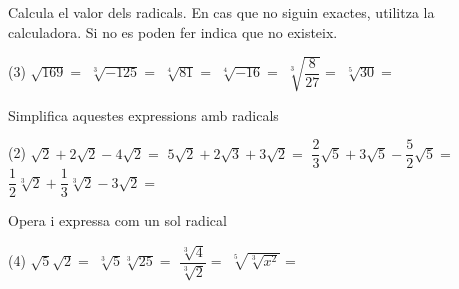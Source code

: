 \documentclass{article}
\let\frac\dfrac
\begin{document}
\begin{mylist}
  \vspace{2cm}
  \item Calcula el valor dels radicals. En cas que no siguin exactes, utilitza la calculadora. Si no es poden fer indica que no existeix.
  \begin{tasks}(3)
  	\task $\sqrt{169}=$
  	\task $\sqrt[3]{-125}=$
  	\task $\sqrt[4]{81}=$
  	\task $\sqrt[4]{-16}=$
  	\task $\sqrt[3]{\frac{8}{27}}=$
  	\task $\sqrt[5]{30}=$
 \end{tasks}

  \item Simplifica aquestes expressions amb radicals
\begin{tasks}(2)
	\task $\sqrt{2} + 2\sqrt{2} - 4 \sqrt{2}=$
	\task $5\sqrt{2} + 2\sqrt{3} + 3 \sqrt{2}=$
	\task $\frac{2}{3}\sqrt{5} + 3\sqrt{5} - \frac{5}{2} \sqrt{5}=$
	\task $\frac{1}{2}\sqrt[3]{2} + \frac{1}{3}\sqrt[3]{2} - 3 \sqrt{2}=$	
\end{tasks}  
  
  
  \item Opera i expressa com un sol radical
  \begin{tasks}(4)
  	\task $\sqrt{5} \sqrt{2} =$ 
  	\task $\sqrt[3]{5} \sqrt[3]{25} =$
  	\task $\frac{\sqrt[3]{4}}{ \sqrt[3]{2}} =$
  	\task $\sqrt[5]{\sqrt[3]{x^2}} =$
  \end{tasks}
 
  \end{mylist}
  
  
  
  
\end{document}
